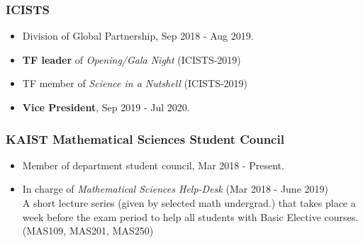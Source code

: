 \documentclass[10pt,a4]{article}
\begin{document}
\begin{small}
\subsubsection*{ICISTS}
\begin{itemize}
	\item Division of Global Partnership, Sep 2018 - Aug 2019.
	
	\item {\bf TF leader} of {\it Opening/Gala Night} (ICISTS-2019)
	
	\item TF member of {\it Science in a Nutshell} (ICISTS-2019)
	
	\item {\bf Vice President}, Sep 2019 - Jul 2020.
	
	
\end{itemize}

%	

\subsubsection*{KAIST Mathematical Sciences Student Council}
\begin{itemize}
	\item Member of department student council, Mar 2018 - Present.
	
	\item In charge of {\it Mathematical Sciences Help-Desk} (Mar 2018 - June 2019) \\
	A short lecture series (given by selected math undergrad.) that takes place a week before the exam period to help all students with Basic Elective courses. (MAS109, MAS201, MAS250)
\end{itemize}

\newpage
\pagestyle{fancy}
\lhead{\textcolor{gray}{\it Junghyun Lee}}
\fancyfoot[C]{}


\end{small}
\end{document}

